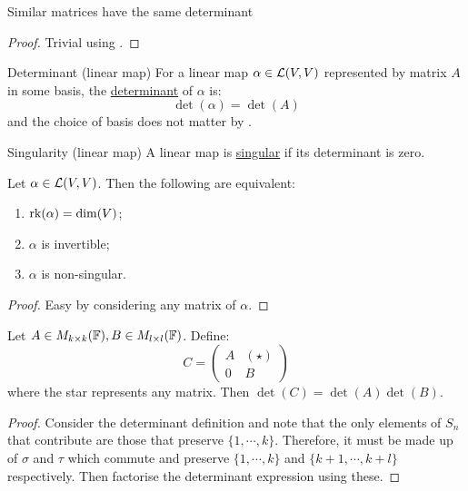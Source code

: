\documentclass[../Main.tex]{subfiles}
\begin{document}
\begin{corollary}
    Similar matrices have the same determinant
    \label{corDetSimilar}
\end{corollary}
\begin{proof}
    Trivial using .
\end{proof}
\begin{definition}{Determinant (linear map)}
    For a linear map $\alpha \in \mathcal{L}(V, V)$ represented by matrix $A$ in some basis, the \underline{determinant} of $\alpha$ is:
    \begin{equation*}
        \det(\alpha) = \det(A)
    \end{equation*}
    and the choice of basis does not matter by .
\end{definition}
\begin{definition}{Singularity (linear map)}
    A linear map is \underline{singular} if its determinant is zero.
\end{definition}
\begin{proposition}
    Let $\alpha \in \mathcal{L}(V, V)$. Then the following are equivalent:
    \begin{enumerate}
        \item $\operatorname{rk}(\alpha) = \dim(V)$;
        \item $\alpha$ is invertible;
        \item $\alpha$ is non-singular.
    \end{enumerate}
    \label{propLinMapDetEquivs}
\end{proposition}
\begin{proof}
    Easy by considering any matrix of $\alpha$.
\end{proof}
\begin{proposition}
    Let $A \in M_{k \times k}(\mathbb{F}), B \in M_{l \times l}(\mathbb{F})$. Define:
    \begin{equation*}
        C = 
        \begin{pmatrix}
            A & (\star) \\
            0 & B
        \end{pmatrix}
    \end{equation*}
    where the star represents any matrix. Then $\det(C) = \det(A) \det(B)$.
    \label{thmBlockTriDet}
\end{proposition}
\begin{proof}
    Consider the determinant definition and note that the only elements of $S_n$ that contribute are those that preserve $\{1, \cdots, k\}$. Therefore, it must be made up of $\sigma$ and $\tau$ which commute and preserve $\{1, \cdots, k\}$ and $\{k+1, \cdots, k + l\}$ respectively. Then factorise the determinant expression using these.
\end{proof}
\end{document}

